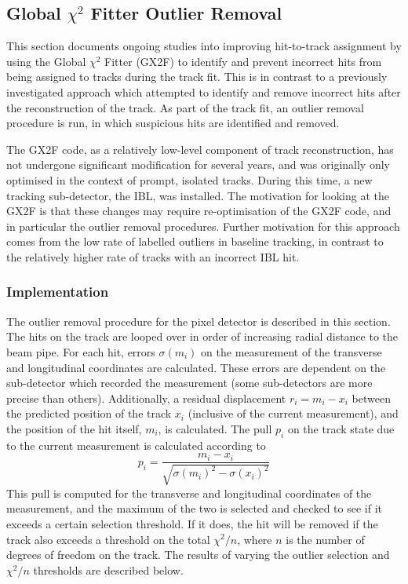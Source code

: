 \subsection{Global \texorpdfstring{$\chi^2$}{chi2} Fitter Outlier Removal}\label{sec:gx2f_opt}

This section documents ongoing studies into improving hit-to-track assignment by using the Global $\chi^2$ Fitter (GX2F) to identify and prevent incorrect hits from being assigned to tracks during the track fit.
This is in contrast to a previously investigated approach \cite{AdorniBraccesiChiassi:2021irw} which attempted to identify and remove incorrect hits after the reconstruction of the track.
As part of the track fit, an outlier removal procedure is run, in which suspicious hits are identified and removed.

The GX2F code, as a relatively low-level component of track reconstruction, has not undergone significant modification for several years, and was originally only optimised in the context of prompt, isolated tracks.
During this time, a new tracking sub-detector, the IBL, was installed.
The motivation for looking at the GX2F is that these changes may require re-optimisation of the GX2F code, and in particular the outlier removal procedures.
Further motivation for this approach comes from the low rate of labelled outliers in baseline tracking, in contrast to the relatively higher rate of tracks with an incorrect IBL hit.


\subsubsection{Implementation}
The outlier removal procedure for the pixel detector is described in this section. The hits on the track are looped over in order of increasing radial distance to the beam pipe. For each hit, errors $\sigma(m_i)$ on the measurement of the transverse and longitudinal coordinates are calculated. These errors are dependent on the sub-detector which recorded the measurement (some sub-detectors are more precise than others). Additionally, a residual displacement $r_i = m_i - x_i$ between the predicted position of the track $x_i$ (inclusive of the current measurement), and the position of the hit itself, $m_i$, is calculated. The pull $p_i$ on the track state due to the current measurement is calculated according to
%
\begin{equation}
    p_i = \frac{m_i - x_i}{\sqrt{\sigma(m_i)^2 - \sigma(x_i)^2}}
\end{equation}
%
This pull is computed for the transverse and longitudinal coordinates of the measurement, and the maximum of the two is selected and checked to see if it exceeds a certain selection threshold. If it does, the hit will be removed if the track also exceeds a threshold on the total $\chi^2/n$, where $n$ is the number of degrees of freedom on the track.
The results of varying the outlier selection and $\chi^2/n$ thresholds are described below.


